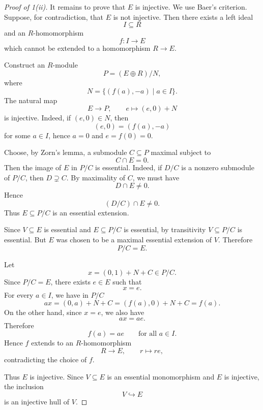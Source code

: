        \begin{proof}[Proof of 1(ii)]
        
        It remains to prove that \(E\) is injective. We use Baer's criterion. Suppose, for
        contradiction, that \(E\) is not injective. Then there exists a left ideal
        \[
            I\subseteq R
        \]
        and an \(R\)-homomorphism
        \[
            f:I\longrightarrow E
        \]
        which cannot be extended to a homomorphism \(R\to E\).
        
        Construct an \(R\)-module
        \[
            P=(E\oplus R)/N,
        \]
        where
        \[
            N=\{(f(a),-a)\mid a\in I\}.
        \]
        The natural map
        \[
            E\longrightarrow P,\qquad e\longmapsto (e,0)+N
        \]
        is injective. Indeed, if \((e,0)\in N\), then
        \[
            (e,0)=(f(a),-a)
        \]
        for some \(a\in I\), hence \(a=0\) and \(e=f(0)=0\).
        
        Choose, by Zorn's lemma, a submodule \(C\subseteq P\) maximal subject to
        \[
            C\cap E=0.
        \]
        Then the image of \(E\) in \(P/C\) is essential. Indeed, if \(D/C\) is a nonzero
        submodule of \(P/C\), then \(D\supsetneq C\). By maximality of \(C\), we must have
        \[
            D\cap E\neq 0.
        \]
        Hence
        \[
            (D/C)\cap E\neq 0.
        \]
        Thus \(E\subseteq P/C\) is an essential extension.
        
        Since \(V\subseteq E\) is essential and \(E\subseteq P/C\) is essential, by transitivity
        \(V\subseteq P/C\) is essential. But \(E\) was chosen to be a maximal essential
        extension of \(V\). Therefore
        \[
            P/C=E.
        \]
        
        Let
        \[
            x=(0,1)+N+C\in P/C.
        \]
        Since \(P/C=E\), there exists \(e\in E\) such that
        \[
            x=e.
        \]
        For every \(a\in I\), we have in \(P/C\)
        \[
            ax=(0,a)+N+C=(f(a),0)+N+C=f(a).
        \]
        On the other hand, since \(x=e\), we also have
        \[
            ax=ae.
        \]
        Therefore
        \[
            f(a)=ae
            \qquad
            \text{for all }a\in I.
        \]
        Hence \(f\) extends to an \(R\)-homomorphism
        \[
            R\longrightarrow E,\qquad r\longmapsto re,
        \]
        contradicting the choice of \(f\).
        
        Thus \(E\) is injective. Since \(V\subseteq E\) is an essential monomorphism and
        \(E\) is injective, the inclusion
        \[
            V\hookrightarrow E
        \]
        is an injective hull of \(V\).
        \end{proof}
        
